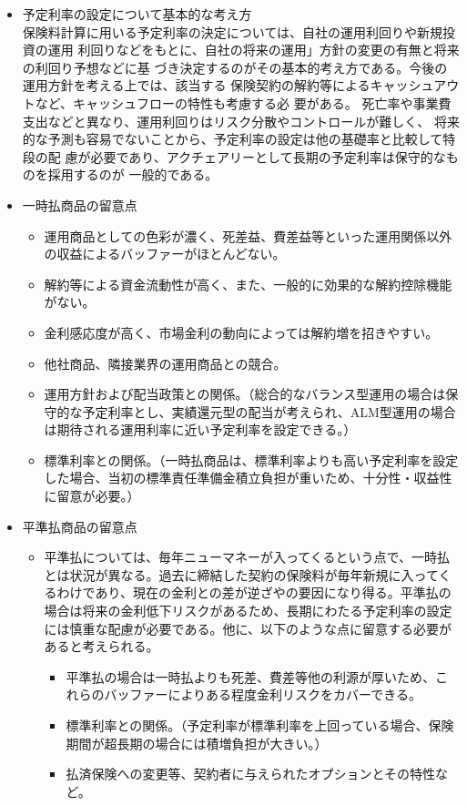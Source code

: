 \documentclass[report,gutter=10mm,fore-edge=10mm,uplatex,dvipdfmx]{jlreq}
\begin{document}
\begin{itemize}
\tightlist
\item
  予定利率の設定について基本的な考え方\\

保険料計算に用いる予定利率の決定については、自社の運用利回りや新規投資の運用
利回りなどをもとに、自社の将来の運用」方針の変更の有無と将来の利回り予想などに基
づき決定するのがその基本的考え方である。今後の運用方針を考える上では、該当する
保険契約の解約等によるキャッシュアウトなど、キャッシュフローの特性も考慮する必
要がある。
死亡率や事業費支出などと異なり、運用利回りはリスク分散やコントロールが難しく、
将来的な予測も容易でないことから、予定利率の設定は他の基礎率と比較して特段の配
慮が必要であり、アクチェアリーとして長期の予定利率は保守的なものを採用するのが
一般的である。

\item
  一時払商品の留意点

  \begin{itemize}
  \tightlist
  \item
    運用商品としての色彩が濃く、死差益、費差益等といった運用関係以外の収益によるバッファーがほとんどない。
  \item
    解約等による資金流動性が高く、また、一般的に効果的な解約控除機能がない。
  \item
    金利感応度が高く、市場金利の動向によっては解約増を招きやすい。
  \item
    他社商品、隣接業界の運用商品との競合。
  \item
    運用方針および配当政策との関係。（総合的なバランス型運用の場合は保守的な予定利率とし、実績還元型の配当が考えられ、ALM型運用の場合は期待される運用利率に近い予定利率を設定できる。）
  \item
    標準利率との関係。（一時払商品は、標準利率よりも高い予定利率を設定した場合、当初の標準責任準備金積立負担が重いため、十分性・収益性に留意が必要。）
  \end{itemize}
\item
  平準払商品の留意点

  \begin{itemize}
  \tightlist
  \item
    平準払については、毎年ニューマネーが入ってくるという点で、一時払とは状況が異なる。過去に締結した契約の保険料が毎年新規に入ってくるわけであり、現在の金利との差が逆ざやの要因になり得る。平準払の場合は将来の金利低下リスクがあるため、長期にわたる予定利率の設定には慎重な配慮が必要である。他に、以下のような点に留意する必要があると考えられる。

    \begin{itemize}
    \tightlist
    \item
      平準払の場合は一時払よりも死差、費差等他の利源が厚いため、これらのバッファーによりある程度金利リスクをカバーできる。
    \item
      標準利率との関係。（予定利率が標準利率を上回っている場合、保険期間が超長期の場合には積増負担が大きい。）
    \item
      払済保険への変更等、契約者に与えられたオプションとその特性など。
    \end{itemize}
  \end{itemize}
\end{itemize}
\end{document}
